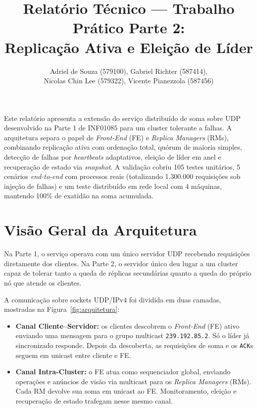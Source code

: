 \documentclass[12pt]{article}
\title{Relatório Técnico --- Trabalho Prático Parte 2:\\
Replicação Ativa e Eleição de Líder}
\author{Adriel de Souza (579100), Gabriel Richter (587414),\\
Nicolas Chin Lee (579322), Vicente Pianezzola (587456)}
\begin{document}
\maketitle

\begin{resumo}
Este relatório apresenta a extensão do serviço distribuído de soma sobre UDP desenvolvido na Parte 1 de INF01085 para um cluster tolerante a falhas. A arquitetura separa o papel de \textit{Front-End} (FE) e \textit{Replica Managers} (RMs), combinando replicação ativa com ordenação total, quórum de maioria simples, detecção de falhas por \textit{heartbeats} adaptativos, eleição de líder em anel e recuperação de estado via \textit{snapshot}. A validação cobriu 105 testes unitários, 5 cenários \textit{end-to-end} com processos reais (totalizando 1.300.000 requisições sob injeção de falhas) e um teste distribuído em rede local com 4 máquinas, mantendo 100\% de exatidão na soma acumulada.
\end{resumo}

\section{Visão Geral da Arquitetura}

Na Parte 1, o serviço operava com um único servidor UDP recebendo requisições diretamente dos clientes. Na Parte 2, o servidor único deu lugar a um cluster capaz de tolerar tanto a queda de réplicas secundárias quanto a queda do próprio nó que atende os clientes.

A comunicação sobre sockets UDP/IPv4 foi dividida em duas camadas, mostradas na Figura~\ref{fig:arquitetura}:

\begin{itemize}
    \item \textbf{Canal Cliente--Servidor:} os clientes descobrem o \textit{Front-End} (FE) ativo enviando uma mensagem para o grupo multicast \texttt{239.192.85.2}. Só o líder já sincronizado responde. Depois da descoberta, as requisições de soma e os \texttt{ACK}s seguem em unicast entre cliente e FE.
    \item \textbf{Canal Intra-Cluster:} o FE atua como sequenciador global, enviando operações e anúncios de visão via multicast para os \textit{Replica Managers} (RMs). Cada RM devolve sua soma em unicast ao FE. Monitoramento, eleição e recuperação de estado trafegam nesse mesmo canal.
\end{itemize}
\end{document}
